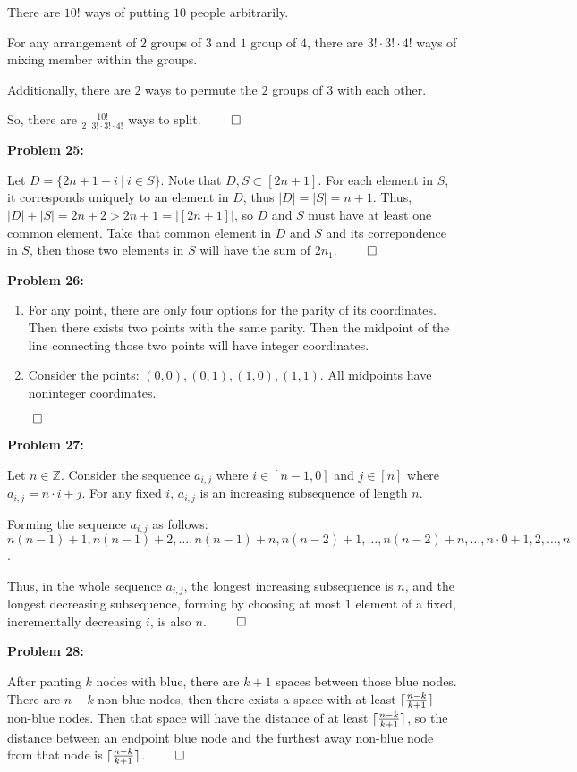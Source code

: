 \documentclass[12pt]{article}
\DeclarePairedDelimiter{\ceil}{\lceil}{\rceil}
\newcommand{\Z}{\mathbb{Z}}
\begin{document}
There are $10!$ ways of putting $10$ people arbitrarily.

For any arrangement of $2$ groups of $3$ and $1$ group of $4$, there are $3! \cdot 3! \cdot 4!$ ways of mixing member within the groups.

Additionally, there are $2$ ways to permute the $2$ groups of $3$ with each other.

So, there are $\frac{10!}{2 \cdot 3! \cdot 3! \cdot 4!}$ ways to split. $\qed$

\textbf{Problem 25:}

Let $D = \{2n+1 - i ~|~ i \in S\}$. Note that $D, S \subset [2n+1]$. For each element in $S$, it corresponds uniquely to an element in $D$, thus $|D| = |S| = n+1$. Thus,  $|D| + |S| = 2n+2 > 2n+1 = |[2n+1]|$, so $D$ and $S$ must have at least one common element. Take that common element in $D$ and $S$ and its correpondence in $S$, then those two elements in $S$ will have the sum of $2n_1$. $\qed$

\textbf{Problem 26:}

\begin{enumerate}[label=(\alph*)]
    \item For any point, there are only four options for the parity of its coordinates. Then there exists two points with the same parity. Then the midpoint of the line connecting those two points will have integer coordinates.
    \item Consider the points: $(0,0), (0,1), (1,0), (1,1)$. All midpoints have noninteger coordinates. 
\end{enumerate} $\qed$

\textbf{Problem 27:}

Let $n \in \Z$. Consider the sequence  $a_{i,j}$ where $i \in [n-1, 0]$ and $j \in [n]$ where $a_{i,j} = n \cdot i + j$. For any fixed $i$, $a_{i,j}$ is an increasing subsequence of length $n$.

Forming the sequence $a_{i,j}$ as follows: $n  (n-1) + 1, n (n-1) + 2, \dots, n(n-1) + n, n(n-2) +1, \dots, n(n-2) + n, \dots, n \cdot 0 + 1, 2, \dots, n$.

Thus, in the whole sequence $a_{i,j}$, the longest increasing subsequence is $n$, and the longest decreasing subsequence, forming by choosing at most $1$ element of a fixed, incrementally decreasing $i$, is also $n$. $\qed$

\textbf{Problem 28:}

After panting $k$ nodes with blue, there are $k+1$ spaces between those blue nodes. There are $n-k$ non-blue nodes, then there exists a space with at least $\ceil{\frac{n-k}{k+1}}$ non-blue nodes. Then that space will have the distance of at least $\ceil{\frac{n-k}{k+1}}$, so the distance between an endpoint blue node and the furthest away non-blue node from that node is $\ceil{\frac{n-k}{k+1}}$.
$\qed$
\end{document}

